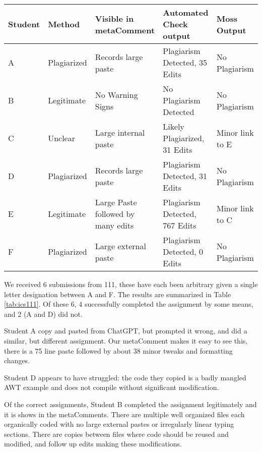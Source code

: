 \documentclass[10pt]{article}
\newcommand{\metaComment}{metaComment\xspace}
\begin{document}
\begin{table*}[thb]
    \centering
    \caption{ICS 111 Case study}
    \label{tab:ics111}
    \begin{tabular}{|l|l|l|l|l|}
        \hline
        Student & Method & Visible in \metaComment & Automated Check output & Moss Output \\
        \hline
        A & Plagiarized & Records large paste & Plagiarism Detected, 35 Edits & No Plagiarism \\\rowcolor{Gray}
        B & Legitimate & No Warning Signs & No Plagiarism Detected & No Plagiarism \\
        C & Unclear & Large internal paste & Likely Plagiarized, 31 Edits & Minor link to E \\\rowcolor{Gray}
        D & Plagiarized& Records large paste & Plagiarism Detected, 31 Edits & No Plagiarism \\
        E & Legitimate & Large Paste followed by many edits & Plagiarism Detected, 767 Edits & Minor link to C \\\rowcolor{Gray}
        F & Plagiarized & Large external paste & Plagiarism Detected, 0 Edits & No Plagiarism \\
        \hline
    \end{tabular}
\end{table*}


We received 6 submissions from 111, these have each been arbitrary given a single letter designation between A and F.  The results are summarized in Table \ref{tab:ics111}.  Of these 6, 4 successfully completed the assignment by some means, and 2 (A and D) did not.

  Student A copy and pasted from ChatGPT, but prompted it wrong, and did a similar, but different assignment.  Our \metaComment makes it easy to see this, there is a 75 line paste followed by about 38 minor tweaks and formatting changes.

Student D appears to have struggled: the code they copied is a badly mangled AWT example and does not compile without significant modification.

Of the correct assignments, Student B completed the assignment legitimately and it is shows in the \metaComment{}s.  There are multiple well organized files each organically coded with no large external pastes or irregularly linear typing sections.  There are copies between files where code should be reused and modified, and follow up edits making these modifications.
\end{document}
